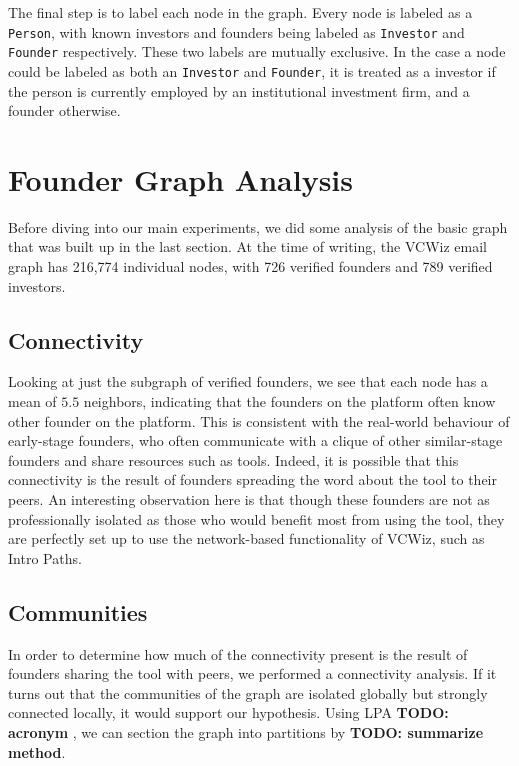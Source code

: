 The final step is to label each node in the graph. Every node is labeled as a \texttt{Person}, with known investors and founders being labeled as \texttt{Investor} and \texttt{Founder} respectively. These two labels are mutually exclusive. In the case a node could be labeled as both an \texttt{Investor} and \texttt{Founder}, it is treated as a investor if the person is currently employed by an institutional investment firm, and a founder otherwise.

\section{Founder Graph Analysis}

Before diving into our main experiments, we did some analysis of the basic graph that was built up in the last section. At the time of writing, the VCWiz email graph has 216,774 individual nodes, with 726 verified founders and 789 verified investors.

\subsection{Connectivity}

Looking at just the subgraph of verified founders, we see that each node has a mean of $5.5$ neighbors, indicating that the founders on the platform often know other founder on the platform. This is consistent with the real-world behaviour of early-stage founders, who often communicate with a clique of other similar-stage founders and share resources such as tools. Indeed, it is possible that this connectivity is the result of founders spreading the word about the tool to their peers. An interesting observation here is that though these founders are not as professionally isolated as those who would benefit most from using the tool, they are perfectly set up to use the network-based functionality of VCWiz, such as Intro Paths.

\subsection{Communities}

In order to determine how much of the connectivity present is the result of founders sharing the tool with peers, we performed a connectivity analysis. If it turns out that the communities of the graph are isolated globally but strongly connected locally, it would support our hypothesis. Using LPA \textbf{TODO: acronym} \cite{2007PhRvE..76c6106R}, we can section the graph into partitions by \textbf{TODO: summarize method}.

